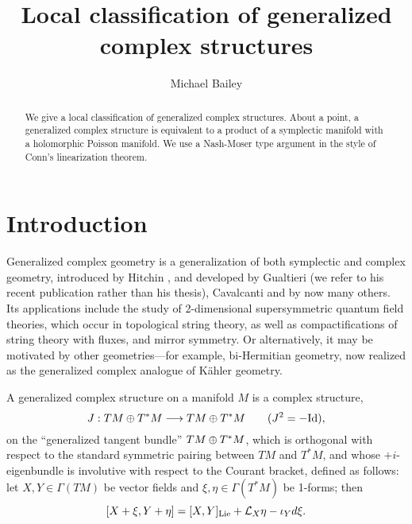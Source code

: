 \documentclass{article}
\begin{document}
\title{Local classification of generalized complex structures}
\author{Michael Bailey}

\maketitle

\begin{abstract}
We give a local classification of generalized complex structures.  About a point, a generalized complex structure is equivalent to a product of a symplectic manifold with a holomorphic Poisson manifold.  We use a Nash-Moser type argument in the style of Conn's linearization theorem.
\end{abstract}

\tableofcontents

\section{Introduction}

Generalized complex geometry is a generalization of both symplectic and complex geometry, introduced by Hitchin \cite{Hitchin2003}, and developed by Gualtieri (we refer to his recent publication \cite{Gualtieri2011} rather than his thesis), Cavalcanti \cite{Cavalcanti} and by now many others.  Its applications include the study of 2-dimensional supersymmetric quantum field theories, which occur in topological string theory, as well as compactifications of string theory with fluxes, and mirror symmetry.  Or alternatively, it may be motivated by other geometries---for example, bi-Hermitian geometry, now realized as the generalized complex analogue of K\"ahler geometry.

\begin{defn}
A generalized complex structure on a manifold $M$ is a complex structure,
$$J : TM \oplus T^*M \longrightarrow TM \oplus T^*M\qquad (J^2 = -\textrm{Id}),$$
on the ``generalized tangent bundle'' ${TM \oplus T^*M}$, which is orthogonal with respect to the standard symmetric pairing between $TM$ and $T^*M$, and whose $+i$-eigenbundle is involutive with respect to the Courant bracket, defined as follows: let $X,Y \in \Gamma(TM)$ be vector fields and $\xi,\eta \in \Gamma(T^*M)$ be 1-forms; then
\begin{equation}\label{bracket formula}
[X+\xi,Y+\eta] = [X,Y]_{\textnormal{Lie}} + \Lie_X \eta - \iota_Y d\xi.
\end{equation}
\end{defn}
\end{document}
